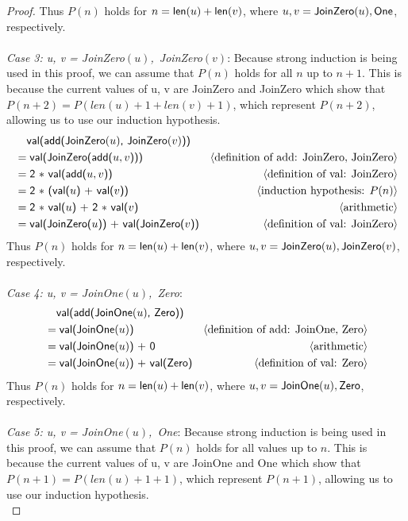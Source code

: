 \documentclass[11pt,fleqn]{article}
\newcommand{\mname}[1]{\mbox{\sf #1}}
\newcommand{\pnote}[1]{{\langle \text{#1} \rangle}}
\begin{document}
\begin{proof}
    Thus $P(n)$ holds for $n = \mname{len}(u) + \mname{len}(v)$, where $u, v = \mname{JoinZero}(u), \mname{ One}$, respectively.
    \\\\
    \emph{Case 3: u, v = \mname{JoinZero$(u)$, JoinZero$(v)$}}: Because strong induction is being used in this proof, we can assume that $P(n)$ holds for all $n$ up to $n + 1$. This is because the current values of u, v are JoinZero and JoinZero which show that $P(n+2) = P(len(u) + 1 + len(v) + 1)$, which represent $P(n+2)$, allowing us to use our induction hypothesis.\\
    \begin{align*}
      &\phantom{{}=} \mname {val(add(JoinZero$(u)$, JoinZero$(v)$))}\\
      &= \mname{val(JoinZero(add($u,v$)))}  & \pnote{definition of add: JoinZero, JoinZero}\\
      &= \mname{2 $*$ val(add($u, v$))}  & \pnote{definition of val: JoinZero}\\
      &= \mname{2 $*$ (val($u$) + val($v$))}  & \pnote{induction hypothesis: $P(n)$}\\
      &= \mname{2 $*$ val($u$) + 2 $*$ val($v$)}  & \pnote{arithmetic}\\
      &= \mname {val(JoinZero($u$)) + val(JoinZero($v$))} & \pnote{definition of val: JoinZero}\\
    \end{align*}
    Thus $P(n)$ holds for $n = \mname{len}(u) + \mname{len}(v)$, where $u, v = \mname{JoinZero}(u), \mname{ JoinZero}(v)$, respectively.
    \\\\
    \emph{Case 4: u, v = \mname{JoinOne$(u)$, Zero}}:
    \begin{align*}
      &\phantom{{}=} \mname {val(add(JoinOne$(u)$, Zero))} \\
      &= \mname{val(JoinOne$(u)$)}  & \pnote{definition of add: JoinOne, Zero}\\
      &= \mname{val(JoinOne$(u)$) + 0}  & \pnote{arithmetic}\\
      &= \mname{val(JoinOne$(u)$) + val(Zero)}  & \pnote{definition of val: Zero}\\
    \end{align*}
    Thus $P(n)$ holds for $n = \mname{len}(u) + \mname{len}(v)$, where $u, v = \mname{JoinOne}(u), \mname{ Zero}$, respectively.
    \\\\
    \emph{Case 5: u, v = \mname{JoinOne$(u)$, One}}: Because strong induction is being used in this proof, we can assume that $P(n)$ holds for all values up to $n$. This is because the current values of u, v are JoinOne and One which show that $P(n+1) = P(len(u) + 1 + 1)$, which represent $P(n+1)$, allowing us to use our induction hypothesis.\\

\end{proof}
\end{document}
